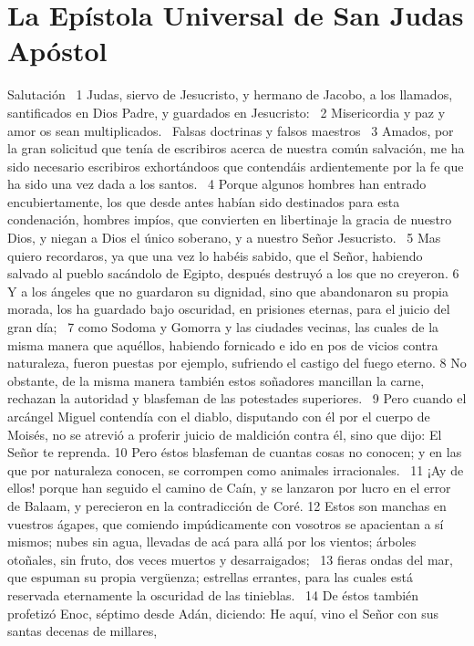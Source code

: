 \chapter{La Epístola Universal de San Judas Apóstol}

Salutación  
1 Judas, siervo de Jesucristo, y hermano de Jacobo, a los llamados, santificados en Dios Padre, y guardados en Jesucristo:  
2 Misericordia y paz y amor os sean multiplicados.  
Falsas doctrinas y falsos maestros   
3 Amados, por la gran solicitud que tenía de escribiros acerca de nuestra común salvación, me ha sido necesario escribiros exhortándoos que contendáis ardientemente por la fe que ha sido una vez dada a los santos.  
4 Porque algunos hombres han entrado encubiertamente, los que desde antes habían sido destinados para esta condenación, hombres impíos, que convierten en libertinaje la gracia de nuestro Dios, y niegan a Dios el único soberano, y a nuestro Señor Jesucristo.  
5 Mas quiero recordaros, ya que una vez lo habéis sabido, que el Señor, habiendo salvado al pueblo sacándolo de Egipto, después destruyó a los que no creyeron. 
6 Y a los ángeles que no guardaron su dignidad, sino que abandonaron su propia morada, los ha guardado bajo oscuridad, en prisiones eternas, para el juicio del gran día;  
7 como Sodoma y Gomorra y las ciudades vecinas, las cuales de la misma manera que aquéllos, habiendo fornicado e ido en pos de vicios contra naturaleza, fueron puestas por ejemplo, sufriendo el castigo del fuego eterno. 
8 No obstante, de la misma manera también estos soñadores mancillan la carne, rechazan la autoridad y blasfeman de las potestades superiores.  
9 Pero cuando el arcángel Miguel contendía con el diablo, disputando con él por el cuerpo de Moisés, no se atrevió a proferir juicio de maldición contra él, sino que dijo: El Señor te reprenda. 
10 Pero éstos blasfeman de cuantas cosas no conocen; y en las que por naturaleza conocen, se corrompen como animales irracionales.  
11 ¡Ay de ellos! porque han seguido el camino de Caín, y se lanzaron por lucro en el error de Balaam, y perecieron en la contradicción de Coré. 
12 Estos son manchas en vuestros ágapes, que comiendo impúdicamente con vosotros se apacientan a sí mismos; nubes sin agua, llevadas de acá para allá por los vientos; árboles otoñales, sin fruto, dos veces muertos y desarraigados;  
13 fieras ondas del mar, que espuman su propia vergüenza; estrellas errantes, para las cuales está reservada eternamente la oscuridad de las tinieblas.  
14 De éstos también profetizó Enoc, séptimo desde Adán, diciendo: He aquí, vino el Señor con sus santas decenas de millares,  
